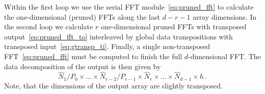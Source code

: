 Within the first loop we use the serial FFT module~\eqref{eq:pruned_fft} to calculate
the one-dimensional (pruned) FFTs along the last $d-r-1$ array dimensions.
In the second loop we calculate $r$ one-dimensional pruned FFTs with transposed output~\eqref{eq:pruned_fft_to}
interleaved by global data transpositions with transposed input~\eqref{eq:gtransp_ti}.
Finally, a single non-transposed FFT~\eqref{eq:pruned_fft} must be computed to finish the full $d$-dimensional FFT.
The data decomposition of the output is then given by
\begin{equation*}
  \hat N_1/P_0 \times \hdots \times \hat N_{r-2}/P_{r-1} \times \hat N_r \times \hdots \times \hat N_{d-1} \times h\,.
\end{equation*}
Note, that the dimensions of the output array are slightly transposed.

